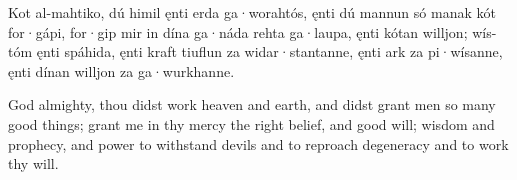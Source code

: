 \bpg
\bpa Kot al-mahtiko, dú himil ęnti erda ga·worahtós, ęnti dú mannun só manak kót for·gápi,
for·gip mir in dína ga·náda rehta ga·laupa, ęnti kótan willjon; wís-tóm ęnti spáhida, ęnti kraft tiuflun za widar·stantanne, ęnti ark za pi·wísanne, ęnti dínan willjon za ga·wurkhanne.\epa

\bpb God almighty, thou didst work heaven and earth, and didst grant men so many good things;
grant me in thy mercy the right belief, and good will; wisdom and prophecy, and power to withstand devils and to reproach degeneracy and to work thy will.\epb
\epg
